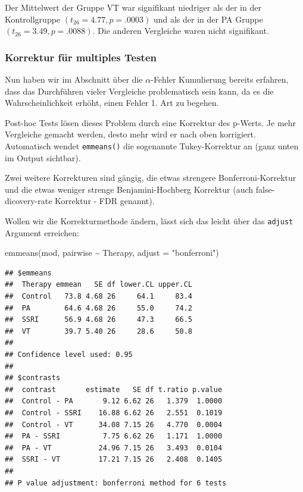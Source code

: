 \documentclass[
]{book}
\newenvironment{Shaded}{\begin{snugshade}}{\end{snugshade}}
\newcommand{\AttributeTok}[1]{\textcolor[rgb]{0.77,0.63,0.00}{#1}}
\newcommand{\FunctionTok}[1]{\textcolor[rgb]{0.00,0.00,0.00}{#1}}
\newcommand{\NormalTok}[1]{#1}
\newcommand{\SpecialCharTok}[1]{\textcolor[rgb]{0.00,0.00,0.00}{#1}}
\newcommand{\StringTok}[1]{\textcolor[rgb]{0.31,0.60,0.02}{#1}}
\begin{document}
Der Mittelwert der Gruppe VT war signifikant niedriger als der in der Kontrollgruppe \((t_{26}=4.77,p=.0003)\) und als der in der PA Gruppe \((t_{26}=3.49,p=.0088)\). Die anderen Vergleiche waren nicht signifikant.

\hypertarget{korrektur-fuxfcr-multiples-testen}{%
\subsubsection{Korrektur für multiples Testen}\label{korrektur-fuxfcr-multiples-testen}}

Nun haben wir im Abschnitt über die \(\alpha\)-Fehler Kumulierung bereits erfahren, dass das Durchführen vieler Vergleiche problematisch sein kann, da es die Wahrscheinlichkeit erhöht, einen Fehler 1. Art zu begehen.

Post-hoc Tests lösen dieses Problem durch eine Korrektur des p-Werts. Je mehr Vergleiche gemacht werden, desto mehr wird er nach oben korrigiert. Automatisch wendet \texttt{emmeans()} die sogenannte Tukey-Korrektur an (ganz unten im Output sichtbar).

Zwei weitere Korrekturen sind gängig, die etwas strengere Bonferroni-Korrektur und die etwas weniger strenge Benjamini-Hochberg Korrektur (auch false-dicovery-rate Korrektur - FDR genannt).

Wollen wir die Korrekturmethode ändern, lässt sich das leicht über das \texttt{adjust} Argument erreichen:

\begin{Shaded}
\begin{Highlighting}[]
\FunctionTok{emmeans}\NormalTok{(mod, pairwise }\SpecialCharTok{\textasciitilde{}}\NormalTok{ Therapy, }\AttributeTok{adjust =} \StringTok{"bonferroni"}\NormalTok{)}
\end{Highlighting}
\end{Shaded}

\begin{verbatim}
## $emmeans
##  Therapy emmean   SE df lower.CL upper.CL
##  Control   73.8 4.68 26     64.1     83.4
##  PA        64.6 4.68 26     55.0     74.2
##  SSRI      56.9 4.68 26     47.3     66.5
##  VT        39.7 5.40 26     28.6     50.8
## 
## Confidence level used: 0.95 
## 
## $contrasts
##  contrast       estimate   SE df t.ratio p.value
##  Control - PA       9.12 6.62 26   1.379  1.0000
##  Control - SSRI    16.88 6.62 26   2.551  0.1019
##  Control - VT      34.08 7.15 26   4.770  0.0004
##  PA - SSRI          7.75 6.62 26   1.171  1.0000
##  PA - VT           24.96 7.15 26   3.493  0.0104
##  SSRI - VT         17.21 7.15 26   2.408  0.1405
## 
## P value adjustment: bonferroni method for 6 tests
\end{verbatim}
\end{document}
